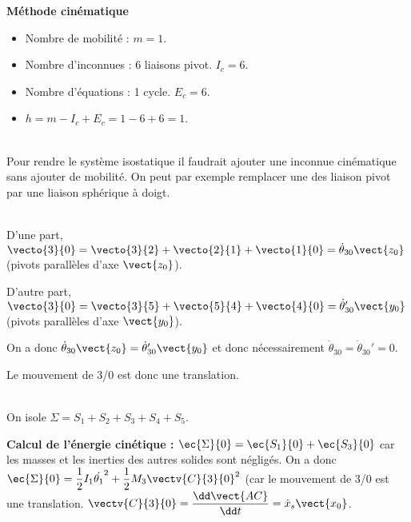 \begin{multicols}{2}
\begin{multicols}{2}
\begin{corrige}
\textbf{Méthode cinématique}

\begin{itemize}
\item Nombre de mobilité : $m=1$.
\item Nombre d'inconnues : 6 liaisons pivot. $I_c=6$. 
\item Nombre d'équations : 1 cycle. $E_c = 6$. 
\item $h=m-I_c+E_c = 1-6+6=1$. 
\end{itemize}

\end{corrige}
\else
\fi


\ifprof
\begin{corrige}~\\
Pour rendre le système isostatique il faudrait ajouter une inconnue cinématique sans ajouter de mobilité. On peut par exemple remplacer une des liaison pivot par une liaison sphérique à doigt. 
\end{corrige}
\else
\fi


\ifprof
\begin{corrige}~\\

D'une part, $\vecto{3}{0}=\vecto{3}{2}+\vecto{2}{1}+\vecto{1}{0}=\dot{\theta}_{30}\vect{z_0}$ (pivots parallèles d'axe $\vect{z_0}$).

D'autre part, $\vecto{3}{0}=\vecto{3}{5}+\vecto{5}{4}+\vecto{4}{0}=\dot{\theta}_{30}'\vect{y_0}$ (pivots parallèles d'axe $\vect{y_0}$).

On a donc $\dot{\theta}_{30}\vect{z_0} = \dot{\theta}_{30}'\vect{y_0}$ et donc nécessairement $\dot{\theta}_{30}=\dot{\theta}_{30}'=0$. 

Le mouvement de 3/0 est donc une translation. 
\end{corrige}
\else
\fi


\ifprof
\begin{corrige}~\\
On isole $\Sigma = S_1 +S_2 + S_3 + S_4 + S_5$.

\textbf{Calcul de l'énergie cinétique :} $\ec{\Sigma}{0}=\ec{S_1}{0}+\ec{S_3}{0}$ car les masses et les inerties des autres solides sont négligés.  On a donc $\ec{\Sigma}{0}=\dfrac{1}{2}I_1\dot{\theta_1}^2 + \dfrac{1}{2}M_3 \vectv{C}{3}{0} ^2$ (car le mouvement de 3/0 est une translation. $\vectv{C}{3}{0}=\dfrac{\dd \vect{AC}}{\dd t}=\dot{x}_s \vect{x_0}$.


\end{corrige}
\end{multicols}
\end{multicols}
